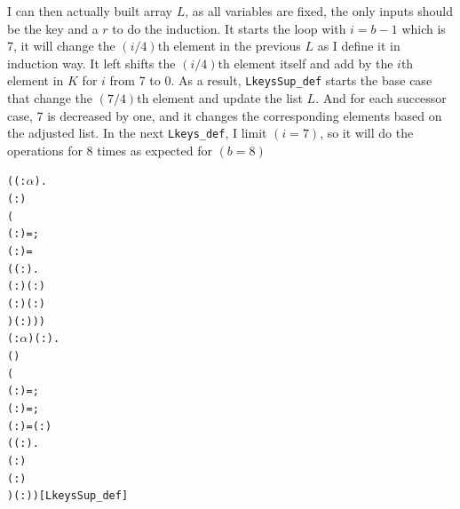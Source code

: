 \documentclass{article}
\begin{document}
I can then actually built array $L$, as all variables are fixed, the only inputs should be the key and a $r$ to do the induction.
It starts the loop with $i=b-1$ which is 7, it will change the $(i/4)$th element in the previous $L$ as I define it in induction
way. It left shifts the $(i/4)$th element itself and add by the $i$th element in $K$ for $i$ from 7 to 0. As a result,
\verb|LkeysSup_def| starts the base case that change the $(7/4)$th element and update the list $L$. And for each successor case,
7 is decreased by one, and it changes the corresponding elements based on the adjusted list. In the next \verb|Lkeys_def|, I limit
$(i=7)$, so it will do the operations for 8 times as expected for $(b=8)$

\begin{alltt}
\HOLTokenTurnstile{} (\HOLSymConst{\HOLTokenForall{}}( :\ensuremath{\alpha} ).
        ( :) \HOLSymConst{=}
      (
         ( : ) = ;
         ( : ) =  
           (\HOLTokenLambda{}( :).
                  \HOLSymConst{=} ( :)  ( :) 
                     \HOLSymConst{\HOLTokenRol{}} ( :) \HOLSymConst{\ensuremath{+}}  ( :) 
                   ) ( :))) \HOLSymConst{\HOLTokenConj{}}
   \HOLSymConst{\HOLTokenForall{}}( :\ensuremath{\alpha} ) ( :).
       ( ) \HOLSymConst{=}
     (
        ( : ) =   ;
        ( : ) =  ;
        ( :) = ( :) \HOLSymConst{\ensuremath{-}}  
          (\HOLTokenLambda{}( :).
                 \HOLSymConst{=}   ( :) 
                    \HOLSymConst{\HOLTokenRol{}} ( :) \HOLSymConst{\ensuremath{+}}   
                  ) ( :))\hfill{[LkeysSup_def]}
\end{alltt}
\end{document}
